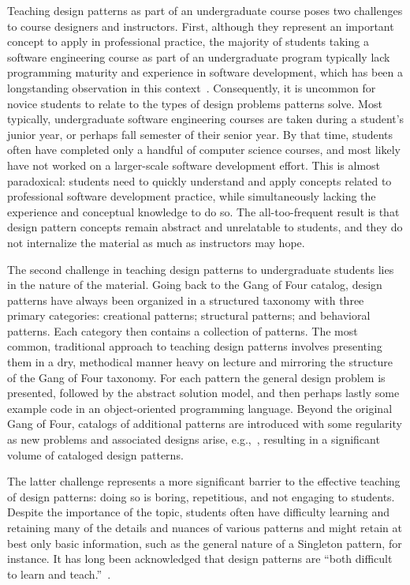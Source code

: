 \documentclass[conference]{IEEEtran}
\begin{document}
Teaching design patterns as part of an undergraduate course poses two challenges to course designers and instructors. First, although they represent an important concept to apply in professional practice, the majority of students taking a software engineering course as part of an undergraduate program typically lack programming maturity and experience in software development, which has been a longstanding observation in this context~\cite{carrington1998}. Consequently, it is uncommon for novice students to relate to the types of design problems patterns solve. Most typically, undergraduate software engineering courses are taken during a student's junior year, or perhaps fall semester of their senior year. By that time, students often have completed only a handful of computer science courses, and most likely have not worked on a larger-scale software development effort. This is almost paradoxical: students need to quickly understand and apply concepts related to professional software development practice, while simultaneously lacking the experience and conceptual knowledge to do so. The all-too-frequent result is that design pattern concepts remain abstract and unrelatable to students, and they do not internalize the material as much as instructors may hope.

The second challenge in teaching design patterns to undergraduate students lies in the nature of the material. Going back to the Gang of Four catalog, design patterns have always been organized in a structured taxonomy with three primary categories: creational patterns; structural patterns; and behavioral patterns. Each category then contains a collection of patterns. The most common, traditional approach to teaching design patterns involves presenting them in a dry, methodical manner heavy on lecture and mirroring the structure of the Gang of Four taxonomy. For each pattern the general design problem is presented, followed by the abstract solution model, and then perhaps lastly some example code in an object-oriented programming language. Beyond the original Gang of Four, catalogs of additional patterns are introduced with some regularity as new problems and associated designs arise, e.g.,~\cite{alahmad2006}, resulting in a significant volume of cataloged design patterns.

The latter challenge represents a more significant barrier to the effective teaching of design patterns: doing so is boring, repetitious, and not engaging to students. Despite the importance of the topic, students often have difficulty learning and retaining many of the details and nuances of various patterns and might retain at best only basic information, such as the general nature of a Singleton pattern, for instance. It has long been acknowledged that design patterns are ``both difficult to learn and teach.''~\cite{pillay2010}.
\end{document}
